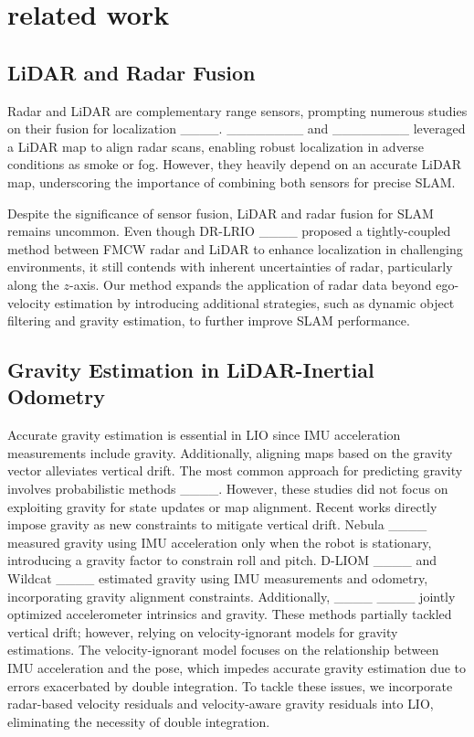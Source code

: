 \section{related work}
\label{sec:relatedwork}

\subsection{LiDAR and Radar Fusion}

Radar and \ac{LiDAR} are complementary range sensors, prompting numerous studies on their fusion for localization ____. ________ and ________ leveraged a \ac{LiDAR} map to align radar scans, enabling robust localization in adverse conditions as smoke or fog. However, they heavily depend on an accurate \ac{LiDAR} map, underscoring the importance of combining both sensors for precise \ac{SLAM}.

Despite the significance of sensor fusion, \ac{LiDAR} and radar fusion for \ac{SLAM} remains uncommon. Even though DR-LRIO ____ proposed a tightly-coupled method between \ac{FMCW} radar and \ac{LiDAR} to enhance localization in challenging environments, it still contends with inherent uncertainties of radar, particularly along the $z$-axis. Our method expands the application of radar data beyond ego-velocity estimation by introducing additional strategies, such as dynamic object filtering and gravity estimation, to further improve \ac{SLAM} performance.

\subsection{Gravity Estimation in LiDAR-Inertial Odometry}
Accurate gravity estimation is essential in \ac{LIO} since \ac{IMU} acceleration measurements include gravity. Additionally, aligning maps based on the gravity vector alleviates vertical drift. The most common approach for predicting gravity involves probabilistic methods ____. However, these studies did not focus on exploiting gravity for state updates or map alignment. Recent works directly impose gravity as new constraints to mitigate vertical drift. Nebula ____ measured gravity using \ac{IMU} acceleration only when the robot is stationary, introducing a gravity factor to constrain roll and pitch. D-LIOM ____ and Wildcat ____ estimated gravity using \ac{IMU} measurements and odometry, incorporating gravity alignment constraints. Additionally, ____ ____ jointly optimized accelerometer intrinsics and gravity.
These methods partially tackled vertical drift; however, relying on velocity-ignorant models for gravity estimations. The velocity-ignorant model focuses on the relationship between \ac{IMU} acceleration and the pose, which impedes accurate gravity estimation due to errors exacerbated by double integration. To tackle these issues, we incorporate radar-based velocity residuals and velocity-aware gravity residuals into \ac{LIO}, eliminating the necessity of double integration.

